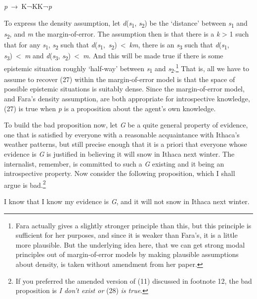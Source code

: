 \documentclass[
  11pt,
  letterpaper,
  DIV=11,
  numbers=noendperiod,
  twoside]{scrartcl}
\providecommand{\tightlist}{%
  \setlength{\itemsep}{0pt}\setlength{\parskip}{0pt}}
\begin{document}
\begin{description}
\tightlist
\item[(27)]
\emph{p}~→~K¬KK¬\emph{p}
\end{description}

To express the density assumption, let
\emph{d}(\emph{s}\textsubscript{1}, \emph{s}\textsubscript{2}) be the
`distance' between \emph{s}\textsubscript{1} and
\emph{s}\textsubscript{2}, and \emph{m} the margin-of-error. The
assumption then is that there is a \emph{k} \textgreater{} 1 such that
for any \emph{s}\textsubscript{1}, \emph{s}\textsubscript{2} such that
\emph{d}(\emph{s}\textsubscript{1},~\emph{s}\textsubscript{2})~\textless~\emph{km},
there is an \emph{s}\textsubscript{3} such that
\emph{d}(\emph{s}\textsubscript{1},
\emph{s}\textsubscript{3})~\textless~\emph{m} and
\emph{d}(\emph{s}\textsubscript{3},
\emph{s}\textsubscript{2})~\textless~\emph{m}. And this will be made
true if there is some epistemic situation roughly `half-way' between
\emph{s}\textsubscript{1} and \emph{s}\textsubscript{2}.\footnote{Fara
  actually gives a slightly stronger principle than this, but this
  principle is sufficient for her purposes, and since it is weaker than
  Fara's, it is a little more plausible. But the underlying idea here,
  that we can get strong modal principles out of margin-of-error models
  by making plausible assumptions about density, is taken without
  amendment from her paper.} That is, all we have to assume to recover
(27) within the margin-of-error model is that the space of possible
epistemic situations is suitably dense. Since the margin-of-error model,
and Fara's density assumption, are both appropriate for introspective
knowledge, (27) is true when \emph{p} is a proposition about the agent's
own knowledge.

To build the bad proposition now, let \emph{G} be a quite general
property of evidence, one that is satisfied by everyone with a
reasonable acquaintance with Ithaca's weather patterns, but still
precise enough that it is a priori that everyone whose evidence is
\emph{G} is justified in believing it will snow in Ithaca next winter.
The internalist, remember, is committed to such a \emph{G} existing and
it being an introspective property. Now consider the following
proposition, which I shall argue is bad.\footnote{If you preferred the
  amended version of (11) discussed in footnote 12, the bad proposition
  is \emph{I don't exist or} (28) \emph{is true}.}

\begin{description}
\tightlist
\item[(28)]
I know that I know my evidence is \emph{G}, and it will not snow in
Ithaca next winter.
\end{description}
\end{document}
